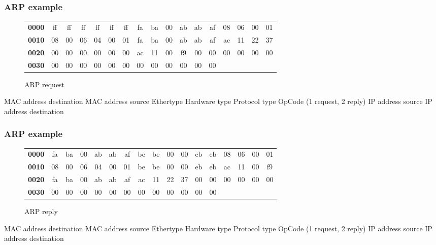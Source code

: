   \begin{frame}
    \frametitle{ARP example}
      \begin{figure}
      \centering
      \resizebox{11.5cm}{!} {
        \begin{tabular}{lcccccccccccccccc}
          \textbf{0000} & \color{red}ff & \color{red}ff & \color{red}ff & \color{red}ff & \color{red}ff & \color{red}ff & \color{Marroon}fa & \color{Marroon}ba & \color{Marroon}00 & \color{Marroon}ab & \color{Marroon}ab & \color{Marroon}af & \color{blue}08 & \color{blue}06 & \color{magenta}00 & \color{magenta}01 \\
          \textbf{0010} & \color{OliveGreen}08 & \color{OliveGreen}00 & \color{gray}06 & \color{gray}04 & \color{fuchsia}00 & \color{fuchsia}01 & \color{Marroon}fa & \color{Marroon}ba & \color{Marroon}00 & \color{Marroon}ab & \color{Marroon}ab & \color{Marroon}af & \color{brown}ac & \color{brown}11 & \color{brown}22 & \color{brown}37 \\
          \textbf{0020} & \color{red}00 & \color{red}00 & \color{red}00 & \color{red}00 & \color{red}00 & \color{red}00 & \color{orange}ac & \color{orange}11 & \color{orange}00 & \color{orange}f9 & 00 & 00 & 00 & 00 & 00 & 00 \\
          \textbf{0030} & 00 & 00 & 00 & 00 & 00 & 00 & 00 & 00 & 00 & 00 & 00 & 00 \\
        \end{tabular}
      }
      \caption{ARP request}
      \label{fig:arp_req_ex-colored}
    \end{figure}
    \color{red}MAC address destination \color{Marroon}MAC address source \color{blue}Ethertype \color{magenta}Hardware type \color{OliveGreen}Protocol type \color{fuchsia}OpCode (1 request, 2 reply) \color{brown} IP address source \color{orange} IP address destination
  \end{frame}
  \begin{frame}
    \frametitle{ARP example}
      \begin{figure}
      \centering
      \resizebox{11.5cm}{!} {
        \begin{tabular}{lcccccccccccccccc}
          \textbf{0000} & fa & ba & 00 & ab & ab & af & be & be & 00 & 00 & eb & eb & 08 & 06 & 00 & 01 \\
          \textbf{0010} & 08 & 00 & 06 & 04 & 00 & 01 & be & be & 00 & 00 & eb & eb & ac & 11 & 00 & f9 \\
          \textbf{0020} & fa & ba & 00 & ab & ab & af & ac & 11 & 22 & 37 & 00 & 00 & 00 & 00 & 00 & 00 \\
          \textbf{0030} & 00 & 00 & 00 & 00 & 00 & 00 & 00 & 00 & 00 & 00 & 00 & 00 \\
        \end{tabular}
      }
      \caption{ARP reply}
      \label{fig:arp_rep_ex}
    \end{figure}
        MAC address destination MAC address source Ethertype Hardware type Protocol type OpCode (1 request, 2 reply) IP address source IP address destination
  \end{frame}
